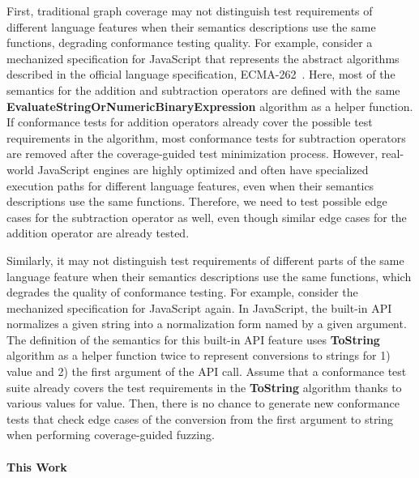 First, traditional graph coverage may not distinguish test requirements of
different language features when their semantics descriptions
use the same functions, degrading conformance testing quality.
For example, consider a mechanized specification for JavaScript that represents the
abstract algorithms described in the official language specification, ECMA-262~\cite{es13}.
Here, most of the semantics for the addition and subtraction operators are
defined with the same \textbf{EvaluateStringOrNumericBinaryExpression} algorithm as a helper function.
If conformance tests for addition operators already cover the possible test
requirements in the algorithm, most conformance tests for subtraction operators
are removed after the coverage-guided test minimization process.
However, real-world JavaScript engines are highly optimized and often have
specialized execution paths for different language features,
even when their semantics descriptions use the same functions.
Therefore, we need to test possible edge cases for the subtraction operator as
well, even though similar edge cases for the addition operator are already tested.


Similarly, it may not distinguish test requirements of different
parts of the same language feature when their semantics descriptions
use the same functions, which degrades the quality of conformance testing.
For example, consider the mechanized specification for JavaScript again.
In JavaScript, the  built-in API normalizes
a given string into a normalization form named by a given argument.
The definition of the semantics for this built-in API feature uses
\textbf{ToString} algorithm as a helper function twice to represent
conversions to strings for 1)  value and 2) the first argument of the API call.
Assume that a conformance test suite already covers the test requirements in the
\textbf{ToString} algorithm thanks to various values for  value.
Then, there is no chance to generate new conformance tests that check edge cases
of the conversion from the first argument to string when performing coverage-guided fuzzing.


\paragraph{\textbf{This Work}}

